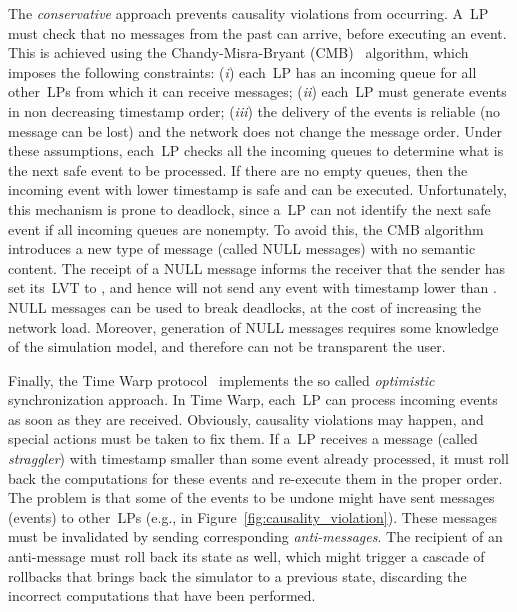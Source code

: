 \documentclass{sigplanconf}
\begin{document}
The \emph{conservative} approach prevents causality violations from
occurring. A~\ac{LP} must check that no messages from the past can
arrive, before executing an event. This is achieved using the
Chandy-Misra-Bryant (CMB)~\cite{misra86} algorithm, which imposes the
following constraints: (\emph{i}) each~\ac{LP} has an incoming queue
for all other~\acp{LP} from which it can receive messages; (\emph{ii})
each~\ac{LP} must generate events in non decreasing timestamp order;
(\emph{iii}) the delivery of the events is reliable (no message can be
lost) and the network does not change the message order. Under these
assumptions, each~\ac{LP} checks all the incoming queues to determine
what is the next safe event to be processed. If there are no empty
queues, then the incoming event with lower timestamp is safe and can
be executed. Unfortunately, this mechanism is prone to deadlock, since
a~\ac{LP} can not identify the next safe event if all incoming queues
are nonempty. To avoid this, the CMB algorithm introduces a new type
of message (called NULL messages) with no semantic content. The
receipt of a NULL message  informs the
receiver that the sender has set its~\ac{LVT} to , and hence will
not send any event with timestamp lower than . NULL messages can be
used to break deadlocks, at the cost of increasing the network
load. Moreover, generation of NULL messages requires some knowledge of
the simulation model, and therefore can not be transparent the user.

Finally, the Time Warp protocol~\cite{Jef85} implements the so called
\emph{optimistic} synchronization approach.  In Time Warp,
each~\ac{LP} can process incoming events as soon as they are received.
Obviously, causality violations may happen, and special actions must
be taken to fix them. If a~\ac{LP} receives a message (called
\emph{straggler}) with timestamp smaller than some event already
processed, it must roll back the computations for these events and
re-execute them in the proper order. The problem is that some of the
events to be undone might have sent messages (events) to
other~\acp{LP} (e.g.,  in
Figure~\ref{fig:causality_violation}). These messages must be
invalidated by sending corresponding \emph{anti-messages}. The
recipient of an anti-message  must roll back its
state as well, which might trigger a cascade of rollbacks that brings
back the simulator to a previous state, discarding the incorrect
computations that have been performed.
\end{document}
